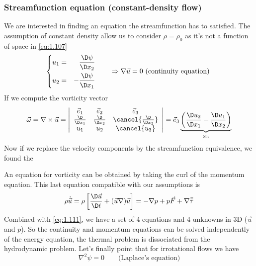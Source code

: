 		\subsubsection{Streamfunction equation (constant-density flow)} 
			We are interested in finding an equation the streamfunction has to satisfied. The assumption of constant density allow us to consider $\rho = \rho _0$ as it's not a function of space in \eqref{eq:1.107} 
			\begin{equation}
				\left\{
		\begin{aligned}
			u_1 &= &\frac{\D\psi}{\D x_2}\\
			u_2 &= &- \frac{\D\psi}{\D x_1}
		\end{aligned}
		\right.
		\qquad \Rightarrow \nabla \vec{u} = 0 \mbox{ (continuity equation) }
		\label{eq:1.111}
			\end{equation}
			If we compute the vorticity vector 
			\begin{equation}
				\vec{\omega} = \nabla \times \vec{u} = 
				\left| 
				\begin{array}{ccc}
				\vec{e}_1 & \vec{e}_2 & \vec{e}_3 \\ 
				\frac{\D}{\D x_1} & \frac{\D}{\D x_2} & \cancel{\frac{\D}{\D x_3}} \\ 
				u_1 & u_2 & \cancel{u_3}
				\end{array} 
				\right|
				= \vec{e}_3 \underbrace{\left(\frac{\D u_2}{\D x_1} - \frac{\D u_1}{\D x_2}\right)}_{\omega _3}
			\end{equation}
			Now if we replace the velocity components by the streamfunction equivalence, we found the
			
			\begin{center}
			\end{center}
			
		 	An equation for vorticity can be obtained by taking the curl of the momentum equation. This last equation compatible with our assumptions is 
		 	\begin{equation}
		 		\rho\dot{\vec{u}} = \rho \left[\frac{\D \vec{u}}{\D t} + (\vec{u}\nabla)\vec{u}\right] = -\nabla p + p\vec{F} + \nabla \bar{\bar{\tau}}
		 	\end{equation}
		 	Combined with \eqref{eq:1.111}, we have a set of 4 equations and 4 unknowns in 3D ($\vec{u}$ and $p$). So the continuity and momentum equations can be solved independently of the energy equation, the thermal problem is dissociated from the hydrodynamic problem. Let's finally point that for irrotational flows we have 
		 	\begin{equation}
		 		\nabla ^2 \psi = 0 \qquad \mbox{(Laplace's equation)} 
		 	\end{equation}
